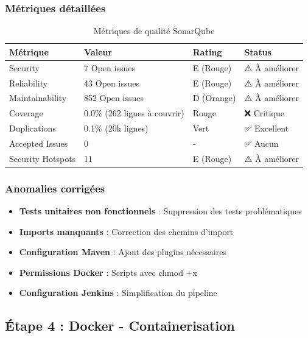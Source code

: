 \documentclass[12pt,a4paper]{article}
\begin{document}
\subsubsection{Métriques détaillées}
\begin{table}[H]
\centering
\begin{tabular}{|l|l|l|l|}
\hline
\textbf{Métrique} & \textbf{Valeur} & \textbf{Rating} & \textbf{Status} \\
\hline
Security & 7 Open issues & E (Rouge) & ⚠️ À améliorer \\
Reliability & 43 Open issues & E (Rouge) & ⚠️ À améliorer \\
Maintainability & 852 Open issues & D (Orange) & ⚠️ À améliorer \\
Coverage & 0.0\% (262 lignes à couvrir) & Rouge & ❌ Critique \\
Duplications & 0.1\% (20k lignes) & Vert & ✅ Excellent \\
Accepted Issues & 0 & - & ✅ Aucun \\
Security Hotspots & 11 & E (Rouge) & ⚠️ À améliorer \\
\hline
\end{tabular}
\caption{Métriques de qualité SonarQube}
\end{table}

\subsubsection{Anomalies corrigées}
\begin{itemize}
    \item \textbf{Tests unitaires non fonctionnels} : Suppression des tests problématiques
    \item \textbf{Imports manquants} : Correction des chemins d'import
    \item \textbf{Configuration Maven} : Ajout des plugins nécessaires
    \item \textbf{Permissions Docker} : Scripts avec chmod +x
    \item \textbf{Configuration Jenkins} : Simplification du pipeline
\end{itemize}

\subsection{Étape 4 : Docker - Containerisation}
\end{document}
